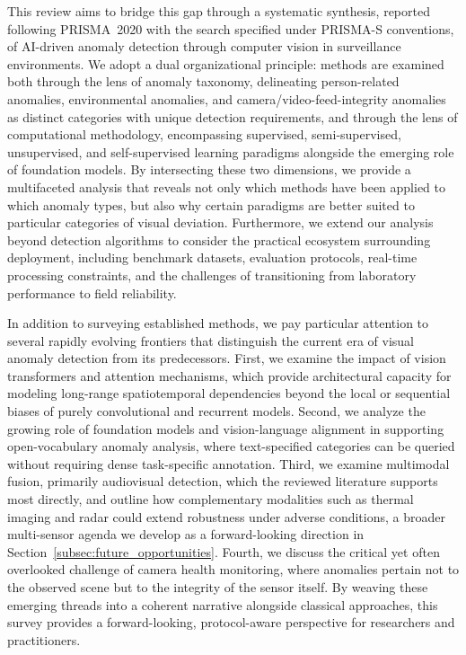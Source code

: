 \documentclass[10pt,a4paper]{article}
\begin{document}
This review aims to bridge this gap through a systematic synthesis, reported following PRISMA~2020 with the search specified under PRISMA-S conventions, of AI-driven anomaly detection through computer vision in surveillance environments. We adopt a dual organizational principle: methods are examined both through the lens of anomaly taxonomy, delineating person-related anomalies, environmental anomalies, and camera/video-feed-integrity anomalies as distinct categories with unique detection requirements, and through the lens of computational methodology, encompassing supervised, semi-supervised, unsupervised, and self-supervised learning paradigms alongside the emerging role of foundation models. By intersecting these two dimensions, we provide a multifaceted analysis that reveals not only which methods have been applied to which anomaly types, but also why certain paradigms are better suited to particular categories of visual deviation. Furthermore, we extend our analysis beyond detection algorithms to consider the practical ecosystem surrounding deployment, including benchmark datasets, evaluation protocols, real-time processing constraints, and the challenges of transitioning from laboratory performance to field reliability.

In addition to surveying established methods, we pay particular attention to several rapidly evolving frontiers that distinguish the current era of visual anomaly detection from its predecessors. First, we examine the impact of vision transformers and attention mechanisms, which provide architectural capacity for modeling long-range spatiotemporal dependencies beyond the local or sequential biases of purely convolutional and recurrent models. Second, we analyze the growing role of foundation models and vision-language alignment in supporting open-vocabulary anomaly analysis, where text-specified categories can be queried without requiring dense task-specific annotation. Third, we examine multimodal fusion, primarily audiovisual detection, which the reviewed literature supports most directly, and outline how complementary modalities such as thermal imaging and radar could extend robustness under adverse conditions, a broader multi-sensor agenda we develop as a forward-looking direction in Section~\ref{subsec:future_opportunities}. Fourth, we discuss the critical yet often overlooked challenge of camera health monitoring, where anomalies pertain not to the observed scene but to the integrity of the sensor itself. By weaving these emerging threads into a coherent narrative alongside classical approaches, this survey provides a forward-looking, protocol-aware perspective for researchers and practitioners.
\end{document}
